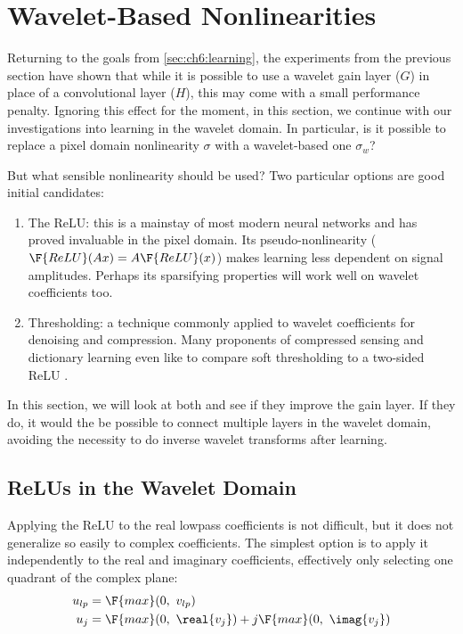 \section{Wavelet-Based Nonlinearities}\label{sec:ch6:nonlinearities}
Returning to the goals from \autoref{sec:ch6:learning}, the experiments from the
previous section have shown that while it is possible to use a wavelet gain
layer ($G$) in place of a convolutional layer ($H$), this may come with a small
performance penalty. Ignoring this effect for the moment, in this section, we
continue with our investigations into learning in the wavelet domain. In
particular, is it possible to replace a pixel domain nonlinearity $\sigma$ with
a wavelet-based one $\sigma_w$?

But what sensible nonlinearity should be used? Two particular options are good initial
candidates:
\begin{enumerate}
  \item The ReLU: this is a mainstay of most modern neural networks and has
    proved invaluable in the pixel domain. Its pseudo-nonlinearity
    ($\F{ReLU}(Ax) = A\F{ReLU}(x)$) makes learning less dependent on signal
    amplitudes. Perhaps its sparsifying
    properties will work well on wavelet coefficients too. 
  \item Thresholding: a technique commonly applied to wavelet
    coefficients for denoising and compression. Many proponents of compressed
    sensing and dictionary learning even like to compare soft thresholding to a
    two-sided ReLU \cite{papyan_theoretical_2018, papyan_convolutional_2016}.
\end{enumerate}

In this section, we will look at both and see if they improve the gain
layer. If they do, it would the be possible to connect multiple layers in the
wavelet domain, avoiding the necessity to do inverse wavelet transforms after
learning.

\subsection{ReLUs in the Wavelet Domain}
Applying the ReLU to the real lowpass coefficients is not difficult, but it does
not generalize so easily to complex coefficients. The simplest option is to apply
it independently to the real and imaginary coefficients, effectively only
selecting one quadrant of the complex plane:
\begin{align}
  u_{lp} &= \F{max}(0,\ v_{lp}) \\
  u_{j} &= \F{max}(0,\ \real{v_{j}}) + j\F{max}(0,\ \imag{v_j}) \label{eq:ch6:relu_bp}
\end{align}

